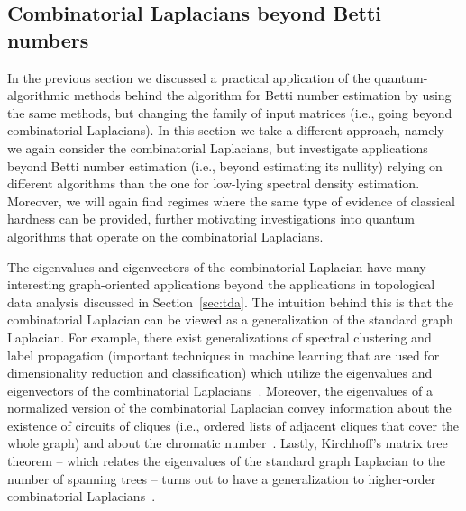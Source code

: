 \documentclass[a4paper, onecolumn, accepted=2022-08-28]{quantumarticle}
\begin{document}
\subsection{Combinatorial Laplacians beyond Betti numbers
  \label{subsec:comb_lapl_beyond_betti}}

In the previous section we discussed a practical application of the quantum-algorithmic methods behind the algorithm for Betti number estimation by using the same methods, but changing the family of input matrices (i.e., going beyond combinatorial Laplacians).
In this section we take a different approach, namely we again consider the combinatorial Laplacians, but investigate applications beyond Betti number estimation (i.e., beyond estimating its nullity) relying on different algorithms than the one for low-lying spectral density estimation.
Moreover, we will again find regimes where the same type of evidence of classical hardness can be provided, further motivating investigations into quantum algorithms that operate on the combinatorial Laplacians.

The eigenvalues and eigenvectors of the combinatorial Laplacian have many interesting graph-oriented applications beyond the applications in topological data analysis discussed in Section~\ref{sec:tda}.
The intuition behind this is that the combinatorial Laplacian can be viewed as a generalization of the standard graph Laplacian.
For example, there exist generalizations of spectral clustering and label propagation (important techniques in machine learning that are used for dimensionality reduction and classification) which utilize the eigenvalues and eigenvectors of the combinatorial Laplacians~\cite{osting:simplicial_clustering_label_propagation}.
Moreover, the eigenvalues of a normalized version of the combinatorial Laplacian convey information about the existence of circuits of cliques (i.e., ordered lists of adjacent cliques that cover the whole graph) and about the chromatic number~\cite{horak:spectra_comb_laplacian}.
Lastly, Kirchhoff's matrix tree theorem -- which relates the eigenvalues of the standard graph Laplacian to the number of spanning trees -- turns out to have a generalization to higher-order combinatorial Laplacians~\cite{duval:matrix-tree}.
\end{document}
